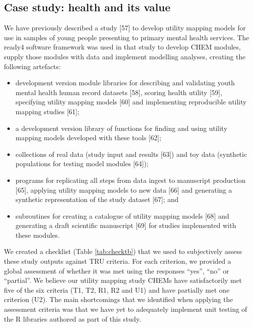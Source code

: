 \documentclass[
]{article}
\begin{document}
\hypertarget{case-study-health-and-its-value}{%
\subsection{Case study: health and its value}\label{case-study-health-and-its-value}}

We have previously described a study {[}57{]} to develop utility mapping models for use in samples of young people presenting to primary mental health services. The ready4 software framework was used in that study to develop CHEM modules, supply those modules with data and implement modelling analyses, creating the following artefacts:

\begin{itemize}
\item
  development version module libraries for describing and validating youth mental health human record datasets {[}58{]}, scoring health utility {[}59{]}, specifying utility mapping models {[}60{]} and implementing reproducible utility mapping studies {[}61{]};
\item
  a development version library of functions for finding and using utility mapping models developed with these tools {[}62{]};
\item
  collections of real data (study input and results {[}63{]}) and toy data (synthetic populations for testing model modules {[}64{]});
\item
  programs for replicating all steps from data ingest to manuscript production {[}65{]}, applying utility mapping models to new data {[}66{]} and generating a synthetic representation of the study dataset {[}67{]}; and
\item
  subroutines for creating a catalogue of utility mapping models {[}68{]} and generating a draft scientific manuscript {[}69{]} for studies implemented with these modules.
\end{itemize}

We created a checklist (Table \ref{tab:checktb}) that we used to subjectively assess these study outputs against TRU criteria. For each criterion, we provided a global assessment of whether it was met using the responses ``yes'', ``no'' or ``partial''. We believe our utility mapping study CHEMs have satisfactorily met five of the six criteria (T1, T2, R1, R2 and U1) and have partially met one criterion (U2). The main shortcomings that we identified when applying the assessment criteria was that we have yet to adequately implement unit testing of the R libraries authored as part of this study.
\end{document}
